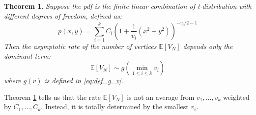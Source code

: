 \documentclass{article}
\newtheorem{theorem}{Theorem}
\def\E{\mathbb{E}}
\begin{document}
\begin{theorem}\label{thm:combination_all}
Suppose the pdf is the finite linear combination of t-distribution with
different degrees of freedom, defined as:
\begin{equation}
    p(x,y) = \sum_{i=1}^k C_i (1+\frac{1}{v_i}(x^2+y^2))^{-v_i/2 - 1}
\end{equation}
Then the asymptotic rate of the number of vertices $\E[V_N]$
depends only the dominant term:
\begin{equation}
    \E[V_N] \sim g(\min_{1\leq i\leq k} v_i)
\end{equation}
where $g(v)$ is defined in \eqref{eq:def_g_v}.
\end{theorem}
Theorem \ref{thm:combination_all} tells us that
the rate $\E[V_N]$ is not an average from $v_1, \dots, v_k$
weighted by $C_1, \dots, C_k$. Instead, it is totally determined by
the smallest $v_i$.
\end{document}
